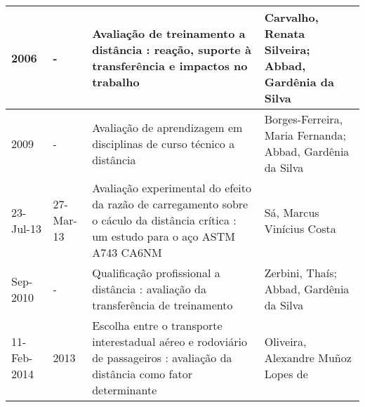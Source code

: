 \begin{table}
{\begin{tabular}{|m{1.3cm}|m{1.3cm}|p{7cm}|p{6cm}|}
2006        & -           & Avaliação de treinamento a distância : reação, suporte à transferência e impactos no trabalho                                                                                                                         & Carvalho, Renata Silveira; Abbad, Gardênia da Silva                                                                                                                                                                                                          \\ \hline
2009        & -           & Avaliação de aprendizagem em disciplinas de curso técnico a distância                                                                                                                                                 & Borges-Ferreira, Maria Fernanda; Abbad, Gardênia da Silva                                                                                                                                                                                                    \\ \hline
23-Jul-13   & 27-Mar-13   & Avaliação experimental do efeito da razão de carregamento sobre o cáculo da distância crítica : um estudo para o aço ASTM A743 CA6NM                                                                                  & Sá, Marcus Vinícius Costa                                                                                                                                                                                                                                    \\ \hline
Sep-2010    & -           & Qualificação profissional a distância : avaliação da transferência de treinamento                                                                                                                                     & Zerbini, Thaís; Abbad, Gardênia da Silva                                                                                                                                                                                                                     \\ \hline
11-Feb-2014 & 2013        & Escolha entre o transporte interestadual aéreo e rodoviário de passageiros : avaliação da distância como fator determinante                                                                                           & Oliveira, Alexandre Muñoz Lopes de                                                                                                                                                                                                                           \\ \hline

\end{tabular}}
\end{table}
